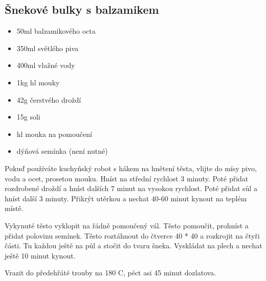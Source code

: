\documentclass[10pt,a4paper]{article}
\newenvironment{myitemize}
{ \begin{itemize}
    \setlength{\itemsep}{0pt}
    \setlength{\parskip}{0pt}
    \setlength{\parsep}{0pt}     }
{ \end{itemize}                  }
\begin{document}
\subsection{Šnekové bulky s balzamikem}
\begin{minipage}[t]{0,5\textwidth}
\begin{myitemize} 
\item 50ml balzamikového octa
\item 350ml světlého piva 
\item 400ml vlažné vody
\item 1kg hl mouky
\item 42g čerstvého droždí
\item 15g soli
\item hl mouka na pomoučení
\item dýňová semínka (není nutné)
\end{myitemize}
\end{minipage}
\begin{minipage}[t]{0,5\textwidth}
Pokuď používáte kuchyňský robot s hákem na hnětení těsta, vlijte do mísy pivo, vodu a ocet, prosetou mouku. Hníst na střední rychlost 3 minuty. Poté přidat rozdrobené droždí a hníst dalších 7 minut na vysokou rychlost. Poté přidat sůl a hníst další 3 minuty. Přikrýt utěrkou a nechat 40-60  minut kynout na teplém místě.

Vykynuté těsto vyklopit na řádně pomoučený vál. Těsto pomoučit, prohníst a přidat polovinu semínek. Těsto roztáhnout do čtverce 40 * 40 a rozkrojit na čtyři části. Tu každou ještě na půl a stočit do tvaru šneka. Vyskládat na plech a nechat ještě 10 minut kynout. 

Vrazit do předehřáté trouby na 180 \degree C, péct asi 45 minut dozlatova.
\end{minipage}
\end{document}
